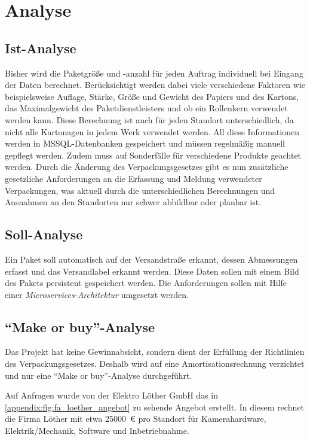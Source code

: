 \section{Analyse}


\subsection{Ist-Analyse}

Bisher wird die Paketgröße und -anzahl für jeden Auftrag individuell bei Eingang der Daten berechnet. Berücksichtigt werden dabei viele verschiedene Faktoren wie beispielsweise Auflage, Stärke, Größe und Gewicht des Papiers und des Kartons, das Maximalgewicht des Paketdienstleisters und ob ein Rollenkern verwendet werden kann. Diese Berechnung ist auch für jeden Standort unterschiedlich, da nicht alle Kartonagen in jedem Werk verwendet werden. All diese Informationen werden in MSSQL-Datenbanken gespeichert und müssen regelmäßig manuell gepflegt werden. Zudem muss auf Sonderfälle für verschiedene Produkte geachtet werden. Durch die Änderung des Verpackungsgesetzes gibt es nun zusätzliche gesetzliche Anforderungen an die Erfassung und Meldung verwendeter Verpackungen, was aktuell durch die unterschiedlichen Berechnungen und Ausnahmen an den Standorten nur schwer abbildbar oder planbar ist.


\subsection{Soll-Analyse}\label{ssec:sollAnalyse}

Ein Paket soll automatisch auf der Versandstraße erkannt, dessen Abmessungen erfasst und das Versandlabel erkannt werden. Diese Daten sollen mit einem Bild des Pakets persistent gespeichert werden. Die Anforderungen sollen mit Hilfe einer \textit{\gls{Microservices-Architektur}} umgesetzt werden.


\subsection{\enquote{Make or buy}-Analyse}

Das Projekt hat keine Gewinnabsicht, sondern dient der Erfüllung der Richtlinien des Verpackungsgesetzes. Deshalb wird auf eine Amortisationsrechnung verzichtet und nur eine \enquote{Make or buy}-Analyse durchgeführt.

Auf Anfragen wurde von der Elektro Löther GmbH das in \vref{appendix:fig:fa_loether_angebot} zu sehende Angebot erstellt. In diesem rechnet die Firma Löther mit etwa \SI{25000}{€} pro Standort für Kamerahardware, Elektrik/Mechanik, Software und Inbetriebnahme.

